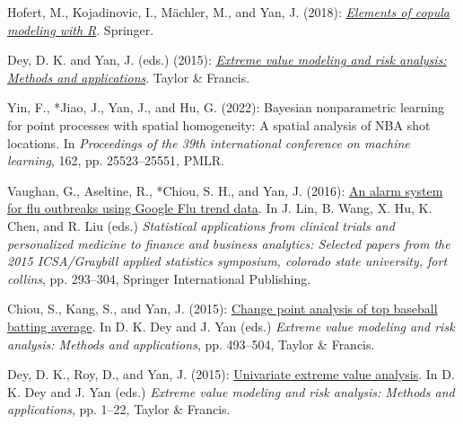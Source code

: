 
\begin{Books}

\item Hofert, M., Kojadinovic, I., M\"{a}chler, M., and Yan, J. (2018):
\emph{\href{https://doi.org/10.1007/978-3-319-89635-9}{Elements of
copula modeling with R}}. Springer.

\item Dey, D. K. and Yan, J. (eds.) (2015):
\emph{\href{https://doi.org/10.1201/b19721}{Extreme value modeling and
risk analysis: Methods and applications}}. Taylor \& Francis.

\end{Books}

\begin{CVBookChapters}

\item Yin, F., *Jiao, J., Yan, J., and Hu, G. (2022): Bayesian
nonparametric learning for point processes with spatial homogeneity: A
spatial analysis of NBA shot locations. In \emph{Proceedings of the 39th
international conference on machine learning}, 162, pp. 25523--25551,
PMLR.

\item *Vaughan, G., Aseltine, R., *Chiou, S. H., and
Yan, J. (2016): \href{https://doi.org/10.1007/978-3-319-42568-9_22}{An
alarm system for flu outbreaks using Google Flu trend data}. In J. Lin,
B. Wang, X. Hu, K. Chen, and R. Liu (eds.) \emph{Statistical
applications from clinical trials and personalized medicine to finance
and business analytics: Selected papers from the 2015 ICSA/Graybill
applied statistics symposium, colorado state university, fort collins},
pp. 293--304, Springer International Publishing.

\item *Chiou, S., Kang, S., and Yan, J. (2015):
\href{https://doi.org/10.1201/b19721-28}{Change point analysis of top
baseball batting average}. In D. K. Dey and J. Yan (eds.) \emph{Extreme
value modeling and risk analysis: Methods and applications}, pp.
493--504, Taylor \& Francis.

\item Dey, D. K., Roy, D., and Yan, J. (2015):
\href{https://doi.org/10.1201/b19721-5}{Univariate extreme value
analysis}. In D. K. Dey and J. Yan (eds.) \emph{Extreme value modeling
and risk analysis: Methods and applications}, pp. 1--22, Taylor \&
Francis.


\end{CVBookChapters}
